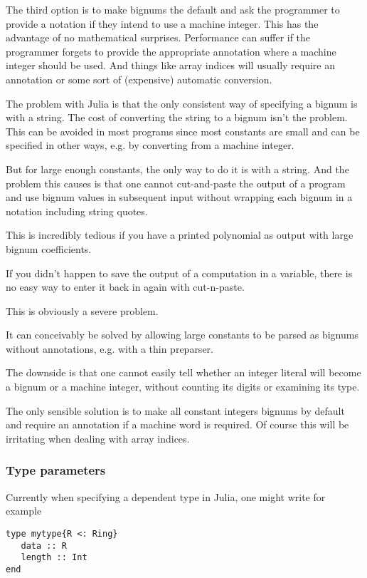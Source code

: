 \documentclass[a4paper,10pt]{article}
\begin{document}
The third option is to make bignums the default and ask the programmer to provide a notation if they
intend to use a machine integer. This has the advantage of no mathematical surprises. Performance can
suffer if the programmer forgets to provide the appropriate annotation where a machine integer should
be used. And things like array indices will usually require an annotation or some sort of (expensive)
automatic conversion.

The problem with Julia is that the only consistent way of specifying a bignum is with a string. The
cost of converting the string to a bignum isn't the problem. This can be avoided in most programs
since most constants are small and can be specified in other ways, e.g. by converting from a machine
integer.

But for large enough constants, the only way to do it is with a string. And the problem this causes
is that one cannot cut-and-paste the output of a program and use bignum values in subsequent input
without wrapping each bignum in a notation including string quotes.

This is incredibly tedious if you have a printed polynomial as output with large bignum coefficients.

If you didn't happen to save the output of a computation in a variable, there is no easy way to enter
it back in again with cut-n-paste. 

This is obviously a severe problem. 

It can conceivably be solved by allowing large constants to be parsed as bignums without annotations,
e.g. with a thin preparser.

The downside is that one cannot easily tell whether an integer literal will become a bignum or a
machine integer, without counting its digits or examining its type.

The only sensible solution is to make all constant integers bignums by default and require an
annotation if a machine word is required. Of course this will be irritating when dealing with array
indices.

\subsubsection{Type parameters}

Currently when specifying a dependent type in Julia, one might write for example

\begin{lstlisting}
type mytype{R <: Ring}
   data :: R
   length :: Int
end
\end{lstlisting}
\end{document}
